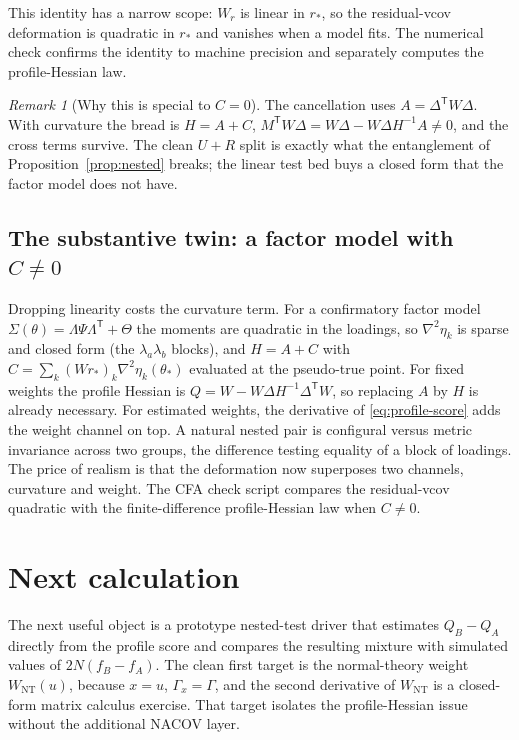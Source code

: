 \documentclass[11pt]{article}
\newcommand{\T}{^{\mathsf{T}}}
\newcommand{\Wr}{W_{\!r}}
\newcommand{\rs}{r_{*}}
\newcommand{\ths}{\theta_{*}}
\theoremstyle{plain}
\theoremstyle{remark}
\newtheorem*{remark}{Remark}
\begin{document}
This identity has a narrow scope: $\Wr$ is linear in $\rs$, so the residual-vcov
deformation is quadratic in $\rs$ and vanishes when a model fits. The numerical
check confirms the identity to machine precision and separately computes the
profile-Hessian law.

\begin{remark}[Why this is special to $C=0$]
The cancellation uses $A=\Delta\T W\Delta$. With curvature the bread is $H=A+C$,
$M\T W\Delta=W\Delta-W\Delta H^{-1}A\neq0$, and the cross terms survive. The clean
$U+R$ split is exactly what the entanglement of Proposition~\ref{prop:nested}
breaks; the linear test bed buys a closed form that the factor model does not have.
\end{remark}

\subsection{The substantive twin: a factor model with $C\neq0$}
\label{sec:cfa}
Dropping linearity costs the curvature term. For a confirmatory factor model
$\Sigma(\theta)=\Lambda\Psi\Lambda\T+\Theta$ the moments are quadratic in the
loadings, so $\nabla^{2}\eta_{k}$ is sparse and closed form (the $\lambda_{a}
\lambda_{b}$ blocks), and $H=A+C$ with $C=\sum_{k}(W\rs)_{k}\nabla^{2}\eta_{k}
(\ths)$ evaluated at the pseudo-true point. For fixed weights the profile Hessian
is $Q=W-W\Delta H^{-1}\Delta\T W$, so replacing $A$ by $H$ is already necessary.
For estimated weights, the derivative of \eqref{eq:profile-score} adds the
weight channel on top. A natural nested pair is configural versus metric
invariance across two groups, the difference testing equality of a block of
loadings. The price of realism is that the deformation now superposes two
channels, curvature and weight. The CFA check script compares the
residual-vcov quadratic with the finite-difference profile-Hessian law when
$C\neq0$.

\section{Next calculation}
\label{sec:next}

The next useful object is a prototype nested-test driver that estimates
$Q_{B}-Q_{A}$ directly from the profile score and compares the resulting mixture
with simulated values of $2N(f_{B}-f_{A})$. The clean first target is the
normal-theory weight $W_{\mathrm{NT}}(u)$, because $x=u$, $\Gamma_{x}=\Gamma$,
and the second derivative of $W_{\mathrm{NT}}$ is a closed-form matrix calculus
exercise. That target isolates the profile-Hessian issue without the additional
NACOV layer.
\end{document}
